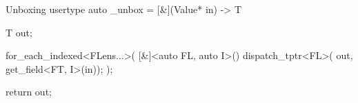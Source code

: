 \begin{mathalgo}{Unboxing usertype}
auto _unbox = [&](Value* in) -> T {
    T out;                                           

    for_each_indexed<FLens...>(
        [&]<auto FL, auto I>() { 
            dispatch_tptr<FL>(
                out, 
                get_field<FT, I>(in));          
        }
    );

    return out;                                         
}
\end{mathalgo}